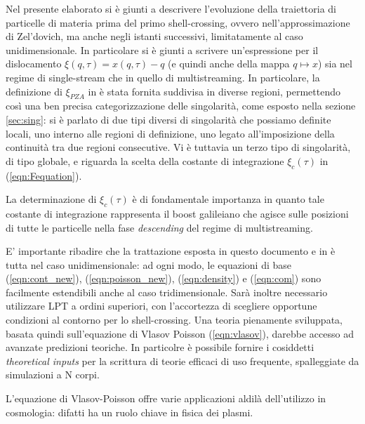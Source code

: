 Nel presente elaborato si è giunti a descrivere l'evoluzione della traiettoria di 
particelle di materia prima del primo shell-crossing, ovvero nell'approssimazione di
Zel'dovich, ma anche negli istanti successivi, limitatamente al caso unidimensionale. 
In particolare si è giunti a scrivere un'espressione per il dislocamento $\xi(q, \tau) = x(q,\tau)-q$
(e quindi anche della mappa $q\mapsto x$) sia nel regime di single-stream che in quello di multistreaming.
In particolare, la definizione di $\xi_{PZA}$ in è stata fornita suddivisa in diverse regioni, permettendo così 
una ben precisa categorizzazione delle singolarità, come esposto nella sezione \ref{sec:sing}: si è 
parlato di due tipi diversi di singolarità che possiamo definite locali, uno interno alle 
regioni di definizione, uno legato all'imposizione della continuità tra due regioni consecutive.
Vi è tuttavia un terzo tipo di singolarità, di tipo globale, e riguarda la scelta della
costante di integrazione $\xi_c(\tau)$ in (\ref{eqn:Fequation}).

\begin{comment}
    qui non ben chiaro cosa si intende per spatial average, e che tipo di singolarità è la terza
\end{comment}

La determinazione di $\xi_c(\tau)$ è di fondamentale importanza in quanto tale costante 
di integrazione rappresenta il boost galileiano che agisce sulle posizioni di tutte le 
particelle nella fase \textit{descending} del regime di multistreaming.

E' importante ribadire che la trattazione esposta in questo documento e in \cite{rampf}
è tutta nel caso unidimensionale: ad ogni modo, le equazioni di base (\ref{eqn:cont_new}),
(\ref{eqn:poisson_new}), (\ref{eqn:density}) e (\ref{eqn:com}) sono facilmente estendibili
anche al caso tridimensionale. Sarà inoltre necessario utilizzare LPT a ordini superiori,
con l'accortezza di scegliere opportune condizioni al contorno per lo shell-crossing.
Una teoria pienamente sviluppata, basata quindi sull'equazione di Vlasov Poisson 
(\ref{eqn:vlasov}), darebbe accesso ad avanzate predizioni teoriche. In particolre è possibile
fornire i cosiddetti \textit{theoretical inputs} per la scrittura di teorie efficaci di uso 
frequente, spalleggiate da simulazioni a N corpi.

L'equazione di Vlasov-Poisson offre varie applicazioni aldilà dell'utilizzo in 
cosmologia: difatti ha un ruolo chiave in fisica dei plasmi.
